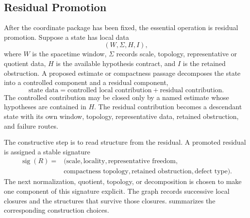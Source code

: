 \documentclass[11pt]{article}
\theoremstyle{plain}
\theoremstyle{definition}
\theoremstyle{remark}
\begin{document}
\subsection{Residual Promotion}
\label{subsec:residual-promotion}

After the coordinate package has been fixed, the essential operation is
residual promotion.  Suppose a state has local data
\[
  (W,\Sigma,H,I),
\]
where \(W\) is the spacetime window, \(\Sigma\) records scale, topology,
representative or quotient data, \(H\) is the available hypothesis
contract, and \(I\) is the retained obstruction.  A proposed estimate or
compactness passage decomposes the state into a controlled component and a
residual component,
\[
  \text{state data} = \text{controlled local contribution}
  + \text{residual contribution}.
\]
The controlled contribution may be closed only by a named estimate whose
hypotheses are contained in \(H\).  The residual contribution becomes a
descendant state with its own window, topology, representative data, retained
obstruction, and failure routes.

The constructive step is to read structure from the residual.  A promoted
residual is assigned a stable signature
\[
  \begin{aligned}
  \operatorname{sig}(R)
  ={}&(\text{scale},\text{locality},\text{representative freedom},\\
      &\text{compactness topology},\text{retained obstruction},
        \text{defect type}).
  \end{aligned}
\]
The next normalization, quotient, topology, or decomposition is chosen to make
one component of this signature explicit.  The graph records successive local
closures and the structures that survive those closures.
 summarizes the corresponding
construction choices.
\end{document}
